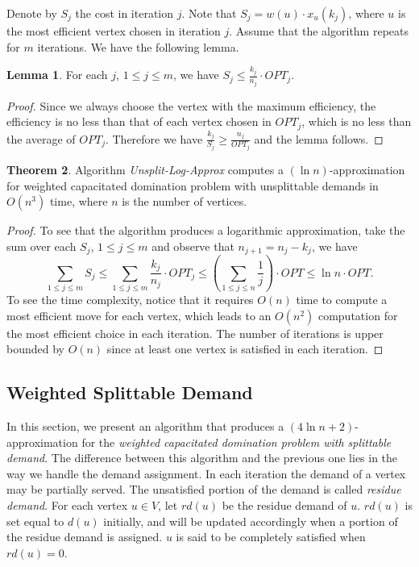 \documentclass[a4paper,11pt]{article}
\theoremstyle{definition}
\newtheorem{theorem}{Theorem}
\newtheorem{lemma}[theorem]{Lemma}
\begin{document}
\smallskip

Denote by $S_j$ the cost in iteration $j$. Note that $S_j = w(u) \cdot x_u(k_j)$, where $u$ is the most efficient vertex chosen
in iteration $j$. Assume that the algorithm repeats for $m$
iterations. 
We have the following lemma.

\begin{lemma} \label{lemma_greedy_weighted_unsplittable}
For each $j$, $1\le j \le m$, we have $S_j\le \frac{k_j}{n_j}\cdot OPT_j$.
\end{lemma}

\begin{proof}
Since we always choose the vertex with the maximum 
efficiency, the efficiency is no less than that of each vertex
chosen in $OPT_j$, which is no less than the average of $OPT_j$. Therefore we have
$\frac{k_j}{S_j} \ge \frac{n_j}{OPT_j}$ and the lemma follows.
\end{proof}

\smallskip

\begin{theorem} \label{theorem_weighted_unsplittable_logn}
Algorithm {\em Unsplit-Log-Approx} computes a $(\ln n)$-approximation for weighted capacitated domination problem with unsplittable demands in $O(n^3)$ time, where $n$ is the number of vertices.
\end{theorem}

\begin{proof}
To see that the algorithm produces a logarithmic approximation, take
the sum over each $S_j$, $1\le j \le m$ and observe that $n_{j+1} = n_j - k_j$, we have
$$\sum_{1\le j\le m}S_j \le \sum_{1\le j \le
m}\frac{k_j}{n_j}\cdot OPT_j \le \left(\sum_{1\le j \le n}\frac{1}{j}\right)\cdot OPT
\le \ln n \cdot OPT.$$
To see the time complexity, notice that it requires $O(n)$ time to compute a most efficient move for each vertex, which leads to an $O(n^2)$ computation for the most efficient choice in each iteration. The number of iterations is upper bounded by $O(n)$ since at least one vertex is satisfied in each iteration.
\end{proof}



\subsection{Weighted Splittable Demand} \label{section_weighted_splittable}

In this section, we
present an algorithm that produces a $(4\ln n+2)$-approximation for
the {\em weighted capacitated domination problem with splittable
demand}. The difference between this algorithm and the previous one lies in the way we handle the demand assignment.  In each iteration the demand of a vertex may be partially served. 
The unsatisfied portion of the demand is called {\it residue demand}. For each vertex $u \in V$, let $rd(u)$ be the residue demand of $u$. $rd(u)$ is set equal to $d(u)$ initially, and will be updated accordingly when a portion of the residue demand is assigned. $u$ is said to be completely satisfied when $rd(u) = 0$.
\end{document}
